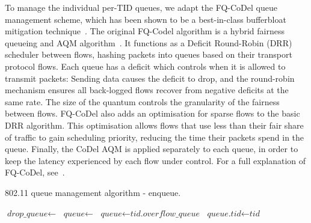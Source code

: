 \documentclass[english]{scrartcl}
\begin{document}
To manage the individual per-TID queues, we adapt the FQ-CoDel queue management
scheme, which has been shown to be a best-in-class bufferbloat mitigation
technique \cite{good-bad-wifi,cablelabs,much-ado}. The original FQ-Codel
algorithm is a hybrid fairness queueing and AQM algorithm \cite{fq-codel}. It
functions as a Deficit Round-Robin (DRR) scheduler
\cite{shreedhar_efficient_1996} between flows, hashing packets into queues based
on their transport protocol flows. Each queue has a deficit which controls when
it is allowed to transmit packets: Sending data causes the deficit to drop, and
the round-robin mechanism ensures all back-logged flows recover from negative
deficits at the same rate. The size of the quantum controls the granularity of
the fairness between flows. FQ-CoDel also adds an optimisation for sparse flows
to the basic DRR algorithm. This optimisation allows flows that use less than
their fair share of traffic to gain scheduling priority, reducing the time their
packets spend in the queue. Finally, the CoDel AQM is applied separately to each
queue, in order to keep the latency experienced by each flow under control. For
a full explanation of FQ-CoDel, see \cite{fq-codel}.

\begin{algorithm}[b]
\caption{\small 802.11 queue management algorithm - enqueue.}
\label{alg:fq-codel-enq}
\begin{algorithmic}[1]
\small
{} \label{ln:beg-enq}
   
    \State $\textit{drop\_queue} \gets$ 
    \State {}
  \EndIf
  \State $\textit{queue} \gets$ 
   \label{ln:beg-chk-st}
    \State $\textit{queue} \gets \textit{tid.overflow\_queue}$
  \EndIf \label{ln:end-chk-st}
  \State $\textit{queue.tid} \gets \textit{tid}$ \label{ln:beg-queue-pkt}
  \State {}  \label{ln:enq-timestamp}
  \State {} \label{ln:end-queue-pkt}
    \State {} \label{ln:act-q}
  \EndIf
\EndFunction \label{ln:end-enq}
\end{algorithmic}
\end{algorithm}
\end{document}
